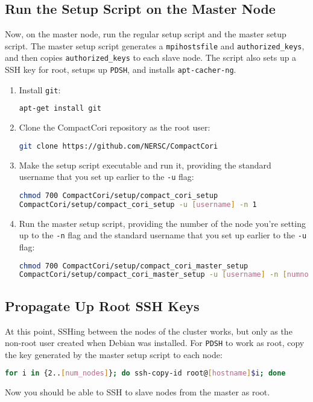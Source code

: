 \documentclass{article}
\begin{document}
    \subsection{Run the Setup Script on the Master Node}
    Now, on the master node, run the regular setup script and the master setup
    script.  The master setup script generates a \texttt{mpihostsfile} and
    \texttt{authorized\_keys}, and then copies \texttt{authorized\_keys} to each
    slave node.  The script also sets up a SSH key for root, setups up
    \texttt{PDSH}, and installs \texttt{apt-cacher-ng}.
        \begin{enumerate}
            \item Install \texttt{git}:\\
                \begin{lstlisting}[language=bash]
apt-get install git
                \end{lstlisting}

            \item Clone the CompactCori repository as the root user:\\
                \begin{lstlisting}[language=bash]
git clone https://github.com/NERSC/CompactCori
                \end{lstlisting}
            \item Make the setup script executable and run it, providing the
                standard username that you set up earlier to the \texttt{-u}
                flag:
                \begin{lstlisting}[language=bash]
chmod 700 CompactCori/setup/compact_cori_setup
CompactCori/setup/compact_cori_setup -u [username] -n 1
                \end{lstlisting}
            \item Run the master setup script, providing the number of the node
                you're setting up to the \texttt{-n} flag and the standard
                username that you set up earlier to the \texttt{-u} flag:
                \begin{lstlisting}[language=bash]
chmod 700 CompactCori/setup/compact_cori_master_setup
CompactCori/setup/compact_cori_master_setup -u [username] -n [numnodes]
                \end{lstlisting}
        \end{enumerate}

\subsection{Propagate Up Root SSH Keys}
    At this point, SSHing between the nodes of the cluster works, but only as
    the non-root user created when Debian was installed.  For \texttt{PDSH} to
    work as root, copy the key generated by the master setup script to each
    node:
                \begin{lstlisting}[language=bash]
for i in {2..[num_nodes]}; do ssh-copy-id root@[hostname]$i; done
                \end{lstlisting}
    Now you should be able to SSH to slave nodes from the master as root.
\end{document}

